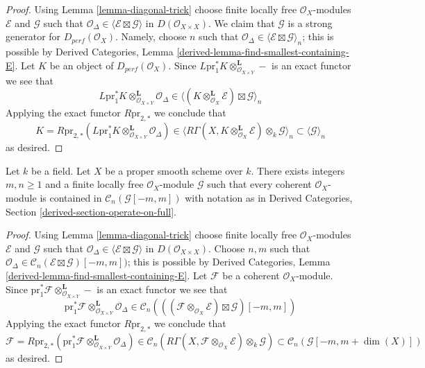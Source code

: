 \begin{proof}
Using Lemma \ref{lemma-diagonal-trick} choose finite locally free
$\mathcal{O}_X$-modules $\mathcal{E}$ and $\mathcal{G}$ such that
$\mathcal{O}_\Delta \in \langle \mathcal{E} \boxtimes \mathcal{G} \rangle$
in $D(\mathcal{O}_{X \times X})$. We claim that $\mathcal{G}$
is a strong generator for $D_{perf}(\mathcal{O}_X)$.
Namely, choose $n$ such that
$\mathcal{O}_\Delta \in \langle \mathcal{E} \boxtimes \mathcal{G} \rangle_n$;
this is possible by Derived Categories, Lemma
\ref{derived-lemma-find-smallest-containing-E}.
Let $K$ be an object of $D_{perf}(\mathcal{O}_X)$.
Since
$L\text{pr}_1^*K \otimes_{\mathcal{O}_{X \times Y}}^\mathbf{L} -$
is an exact functor we see that
$$
L\text{pr}_1^*K \otimes_{\mathcal{O}_{X \times Y}}^\mathbf{L} \mathcal{O}_\Delta
\in
\langle
(K \otimes_{\mathcal{O}_X}^\mathbf{L} \mathcal{E}) \boxtimes \mathcal{G}
\rangle_n
$$
Applying the exact functor $R\text{pr}_{2, *}$ we conclude that
$$
K = R\text{pr}_{2, *}(L\text{pr}_1^*K
\otimes_{\mathcal{O}_{X \times Y}}^\mathbf{L} \mathcal{O}_\Delta)
\in
\langle
R\Gamma(X, K \otimes_{\mathcal{O}_X}^\mathbf{L} \mathcal{E})
\otimes_k \mathcal{G}
\rangle_n
\subset \langle \mathcal{G} \rangle_n
$$
as desired.
\end{proof}

\begin{lemma}
\label{lemma-diagonal-trick-proper}
Let $k$ be a field. Let $X$ be a proper smooth scheme over $k$.
There exists integers $m, n \geq 1$ and a finite locally free
$\mathcal{O}_X$-module $\mathcal{G}$ such that every coherent
$\mathcal{O}_X$-module is contained in $\mathcal{C}_n(\mathcal{G}[-m, m])$
with notation as in Derived Categories, Section
\ref{derived-section-operate-on-full}.
\end{lemma}

\begin{proof}
Using Lemma \ref{lemma-diagonal-trick} choose finite locally free
$\mathcal{O}_X$-modules $\mathcal{E}$ and $\mathcal{G}$ such that
$\mathcal{O}_\Delta \in \langle \mathcal{E} \boxtimes \mathcal{G} \rangle$
in $D(\mathcal{O}_{X \times X})$.
Choose $n, m$ such that $\mathcal{O}_\Delta \in
\mathcal{C}_n(\mathcal{E} \boxtimes \mathcal{G})[-m, m])$;
this is possible by Derived Categories, Lemma
\ref{derived-lemma-find-smallest-containing-E}.
Let $\mathcal{F}$ be a coherent $\mathcal{O}_X$-module.
Since
$\text{pr}_1^*\mathcal{F} \otimes_{\mathcal{O}_{X \times Y}}^\mathbf{L} -$
is an exact functor we see that
$$
\text{pr}_1^*\mathcal{F}
\otimes_{\mathcal{O}_{X \times Y}}^\mathbf{L} \mathcal{O}_\Delta
\in
\mathcal{C}_n(
((\mathcal{F} \otimes_{\mathcal{O}_X} \mathcal{E})
\boxtimes \mathcal{G})[-m, m])
$$
Applying the exact functor $R\text{pr}_{2, *}$ we conclude that
$$
\mathcal{F} = R\text{pr}_{2, *}(\text{pr}_1^*\mathcal{F}
\otimes_{\mathcal{O}_{X \times Y}}^\mathbf{L} \mathcal{O}_\Delta)
\in
\mathcal{C}_n(
R\Gamma(X, \mathcal{F} \otimes_{\mathcal{O}_X} \mathcal{E})
\otimes_k \mathcal{G})
\subset \mathcal{C}_n(\mathcal{G}[-m , m + \dim(X)])
$$
as desired.
\end{proof}


